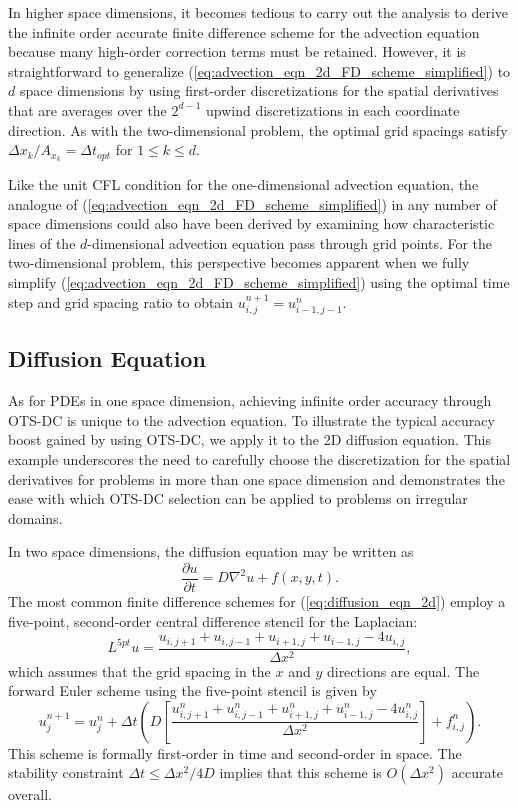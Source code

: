 \documentclass[fleqn,12pt,twoside]{article}
\newcommand{\beq}{\begin{equation}}
\newcommand{\eeq}{\end{equation}}
\def\pt{\partial t}
\def\dt{\Delta t}
\def\dx{\Delta x}
\begin{document}
In higher space dimensions, it becomes tedious to carry out the analysis 
to derive the infinite order accurate finite difference scheme for the 
advection equation because many high-order correction terms must be retained.  
However, it is straightforward to generalize 
(\ref{eq:advection_eqn_2d_FD_scheme_simplified}) to $d$ space dimensions by 
using first-order discretizations for the spatial derivatives that are 
averages over the $2^{d-1}$ upwind discretizations in each coordinate 
direction.   As with the two-dimensional problem, the optimal grid spacings 
satisfy $\dx_k/A_{x_k} = \dt_{opt}$ for $1 \le k \le d$.

Like the unit CFL condition for the one-dimensional advection equation, the 
analogue of (\ref{eq:advection_eqn_2d_FD_scheme_simplified}) in any number
of space dimensions could also have been derived by examining how 
characteristic lines of the $d$-dimensional advection equation pass 
through grid points.  For the two-dimensional problem, this perspective 
becomes apparent when we fully simplify 
(\ref{eq:advection_eqn_2d_FD_scheme_simplified}) using the 
optimal time step and grid spacing ratio to obtain
$u^{n+1}_{i,j} = u^{n}_{i-1,j-1}$.



\subsection{Diffusion Equation \label{sec:diffusion_eqn_2d}}
As for PDEs in one space dimension, achieving infinite order accuracy 
through OTS-DC is unique to the advection equation.
To illustrate the typical accuracy boost gained by using OTS-DC,
we apply it to the 2D diffusion equation.  This example underscores 
the need to carefully choose the discretization for the spatial derivatives 
for problems in more than one space dimension and demonstrates the ease with 
which OTS-DC selection can be applied to problems on irregular domains.

In two space dimensions, the diffusion equation may be written as
\beq
  \frac{\partial u}{\pt} = D \nabla^2 u + f(x,y,t).
  \label{eq:diffusion_eqn_2d}
\eeq
The most common finite difference schemes for (\ref{eq:diffusion_eqn_2d}) 
employ a five-point, second-order central difference stencil for the 
Laplacian:
\beq
  L^{5pt} u = \frac{u_{i,j+1} + u_{i,j-1}
                   +u_{i+1,j} + u_{i-1,j} - 4u_{i,j}}{\dx^2},
  \label{eq:laplacian_2d_5pt_stencil}
\eeq
which assumes that the grid spacing in the $x$ and $y$ directions are
equal.  The forward Euler scheme using the five-point stencil is given by
\beq
  u^{n+1}_j = u^{n}_j 
  + \dt 
    \left( D \left[\frac{u^{n}_{i,j+1} + u^{n}_{i,j-1}
             +u^{n}_{i+1,j} + u^{n}_{i-1,j} - 4u^{n}_{i,j}}{\dx^2} \right]
         + f_{i,j}^n
    \right).
  \label{eq:diffusion_eqn_2d_5pt_scheme}
\eeq
This scheme is formally first-order in time and second-order in space.  
The stability constraint $\dt \le \dx^2/4D$ implies that this scheme is
$O(\dx^2)$ accurate overall.
\end{document}
